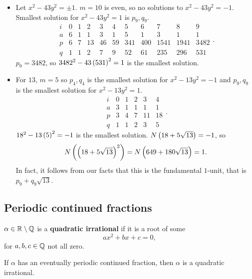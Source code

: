 \begin{example2}
\hfill
\begin{itemize}
\item Let $ x^2 - 43y^2 = \pm 1 $. $ m = 10 $ is even, so no solutions to $ x^2 - 43y^2 = -1 $. Smallest solution for $ x^2 - 43y^2 = 1 $ is $ p_9, q_9 $.
$$
\begin{array}{c|cccccccccc}
i & 0 & 1 & 2 & 3 & 4 & 5 & 6 & 7 & 8 & 9 \\
\hline
a & 6 & 1 & 1 & 3 & 1 & 5 & 1 & 3 & 1 & 1 \\
p & 6 & 7 & 13 & 46 & 59 & 341 & 400 & 1541 & 1941 & 3482 \\
q & 1 & 1 & 2 & 7 & 9 & 52 & 61 & 235 & 296 & 531
\end{array}.
$$
$ p_9 = 3482 $, so $ 3482^2 - 43\left( 531 \right)^2 = 1 $ is the smallest solution.
\item For $ 13 $, $ m = 5 $ so $ p_4, q_4 $ is the smallest solution for $ x^2 - 13y^2 = -1 $ and $ p_9, q_9 $ is the smallest solution for $ x^2 - 13y^2 = 1 $.
$$
\begin{array}{c|ccccc}
i & 0 & 1 & 2 & 3 & 4 \\
\hline
a & 3 & 1 & 1 & 1 & 1 \\
p & 3 & 4 & 7 & 11 & 18 \\
q & 1 & 1 & 2 & 3 & 5
\end{array}.
$$
$ 18^2 - 13\left( 5 \right)^2 = -1 $ is the smallest solution. $ N\left( 18 + 5\sqrt{13} \right) = -1 $, so
$$ N\left( \left( 18 + 5\sqrt{13} \right)^2 \right) = N\left( 649 + 180\sqrt{13} \right) = 1. $$
In fact, it follows from our facts that this is the fundamental $ 1 $-unit, that is $ p_9 + q_9\sqrt{13} $.
\end{itemize}
\end{example2}


\subsection{Periodic continued fractions}

\begin{definition}
$ \alpha \in \mathbb{R} \setminus \mathbb{Q} $ is a \textbf{quadratic irrational} if it is a root of some
$$ ax^2 + bx + c = 0, $$
for $ a, b, c \in \mathbb{Q} $ not all zero.
\end{definition}

\begin{proposition}
If $ \alpha $ has an eventually periodic continued fraction, then $ \alpha $ is a quadratic irrational.
\end{proposition}

